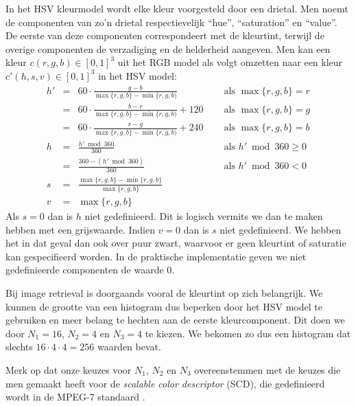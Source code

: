 In het HSV kleurmodel wordt elke kleur voorgesteld door een drietal. Men noemt de componenten van 
zo'n drietal respectievelijk ``hue'', ``saturation'' en ``value''. De eerste van deze componenten
correspondeert met de kleurtint, terwijl de overige componenten de verzadiging en de helderheid
aangeven. Men kan een kleur $c(r,g,b) \in [0,1]^3$ uit het RGB model als volgt omzetten naar een 
kleur $c'(h,s,v) \in [0,1]^3$ in het HSV model:
$$
\begin{array}{rcll}
h' & = & 60 \cdot \frac{g - b}{\max \{r,g,b\} - \min \{r,g,b)}\quad & \textrm{ als } \max \{r,g,b\} = r \\[2pt]
  & = & 60 \cdot \frac{b - r}{\max \{r,g,b\} - \min \{r,g,b)} + 120\quad & \textrm{ als } \max \{r,g,b\} = g \\[2pt]
  & = & 60 \cdot \frac{r - g}{\max \{r,g,b\} - \min \{r,g,b)} + 240\quad & \textrm{ als } \max \{r,g,b\} = b \\[6pt]
h & = & \frac{h' \bmod 360}{360} & \textrm{ als } h' \bmod 360 \geq 0 \\[2pt]
  & = & \frac{360 - (h' \bmod 360)}{360} & \textrm{ als } h' \bmod 360 < 0 \\[6pt]
s & = & \frac{\max \{r,g,b\} - \min \{r,g,b\}}{\max \{r,g,b\}} & \\[6pt]
v & = & \max \{r,g,b\}
\end{array}
$$
Als $s=0$ dan is $h$ niet gedefinieerd. Dit is logisch vermits we dan te maken hebben met een 
grijswaarde. Indien $v=0$ dan is $s$ niet gedefinieerd. We hebben het in dat geval dan ook over 
puur zwart, waarvoor er geen kleurtint of saturatie kan gespecifieerd worden. In de praktische
implementatie geven we niet gedefinieerde componenten de waarde 0.

Bij image retrieval is doorgaands vooral de kleurtint op zich belangrijk. We kunnen de grootte van
een histogram dus beperken door het HSV model te gebruiken en meer belang te hechten aan de
eerste kleurcomponent. Dit doen we door $N_1=16$, $N_2=4$ en $N_3=4$ te kiezen. We bekomen zo dus
een histogram dat slechts $16 \cdot 4 \cdot 4 = 256$ waarden bevat. 

Merk op dat onze keuzes voor $N_1$, $N_2$ en $N_3$ overeenstemmen met de keuzes die men gemaakt
heeft voor de \emph{scalable color descriptor} (SCD), die gedefinieerd wordt in de MPEG-7
standaard \cite{manjunath:color_and_texture_descriptors}.

